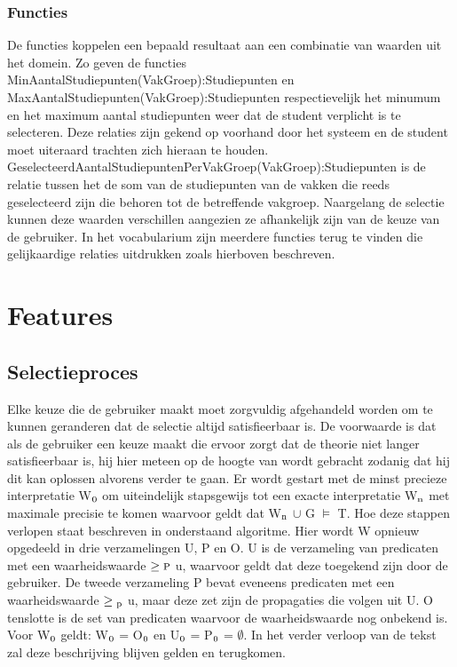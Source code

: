 \subsubsection{Functies}
De functies koppelen een bepaald resultaat aan een combinatie van waarden uit het domein. Zo geven de functies MinAantalStudiepunten(VakGroep):Studiepunten en MaxAantalStudiepunten(VakGroep):Studiepunten respectievelijk het minumum en het maximum aantal studiepunten weer dat de student verplicht is te selecteren. Deze relaties zijn gekend op voorhand door het systeem en de student moet uiteraard trachten zich hieraan te houden. GeselecteerdAantalStudiepuntenPerVakGroep(VakGroep):Studiepunten is de relatie tussen het de som van de studiepunten van de vakken die reeds geselecteerd zijn die behoren tot de betreffende vakgroep. Naargelang de selectie kunnen deze waarden verschillen aangezien ze afhankelijk zijn van de keuze van de gebruiker. In het vocabularium zijn meerdere functies terug te vinden die gelijkaardige relaties uitdrukken zoals hierboven beschreven. 


\section{Features}

\subsection{Selectieproces}
Elke keuze die de gebruiker maakt moet zorgvuldig afgehandeld worden om te kunnen geranderen dat de selectie altijd satisfieerbaar is. De voorwaarde is dat als de gebruiker een keuze maakt die ervoor zorgt dat de theorie niet langer satisfieerbaar is, hij hier meteen op de hoogte van wordt gebracht zodanig dat hij dit kan oplossen alvorens verder te gaan. Er wordt gestart met de minst precieze interpretatie W$\textsubscript{0}$ om uiteindelijk stapsgewijs tot een exacte interpretatie W$\textsubscript{n}$ met maximale precisie te komen waarvoor geldt dat W$\textsubscript{n}$ $\cup$ G $\models$ T. Hoe deze stappen verlopen staat beschreven in onderstaand algoritme. Hier wordt W opnieuw opgedeeld in drie verzamelingen U, P en O. U is de verzameling van predicaten met een waarheidswaarde $\geq\textsc{p}$ u, waarvoor geldt dat deze toegekend zijn door de gebruiker. De tweede verzameling P bevat eveneens predicaten met een waarheidswaarde $\geq\textsubscript{p}$ u, maar deze zet zijn de propagaties die volgen uit U. O tenslotte is de set van predicaten waarvoor de waarheidswaarde nog onbekend is. Voor W$\textsubscript{0}$ geldt: W$\textsubscript{0}$ = O$\textsubscript{0}$ en U$\textsubscript{0}$ = P$\textsubscript{0}$ = $\emptyset$. In het verder verloop van de tekst zal deze beschrijving blijven gelden en terugkomen.

